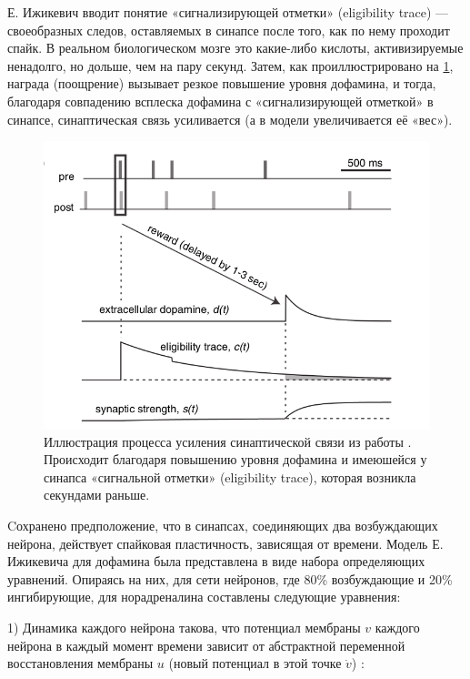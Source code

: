 Е. Ижикевич вводит понятие «сигнализирующей отметки» (eligibility trace) — своеобразных следов, оставляемых в синапсе после того, как по нему проходит спайк. В реальном биологическом мозге это какие-либо кислоты, активизируемые ненадолго, но дольше, чем на пару секунд. Затем, как проиллюстрировано на \ref{fig:izhikevich}, награда (поощрение) вызывает резкое повышение уровня дофамина, и тогда, благодаря совпадению всплеска дофамина с «сигнализирующей отметкой» в синапсе, синаптическая связь усиливается (а в модели увеличивается её «вес»).


\begin{figure}
	\centering
	\includegraphics[width=\linewidth]{figures/izhikevich}
	\caption{Иллюстрация процесса усиления синаптической связи из работы \cite{izhikevich}. Происходит благодаря повышению уровня дофамина и имеюшейся у синапса «сигнальной отметки» (eligibility trace), которая возникла секундами раньше.}
	\label{fig:izhikevich}
\end{figure}


Cохранено предположение, что в синапсах, соединяющих два возбуждающих нейрона, действует спайковая пластичность, зависящая от времени. Модель Е. Ижикевича для дофамина была представлена в виде набора определяющих уравнений. Опираясь на них, для сети нейронов, где 80\% возбуждающие и 20\% ингибирующие, для норадреналина составлены следующие уравнения:


1) Динамика каждого нейрона такова, что потенциал мембраны $v$ каждого нейрона в каждый момент времени зависит от абстрактной переменной восстановления мембраны $u$ (новый потенциал в этой точке $\dot{v}$) \cite{tactile}:


